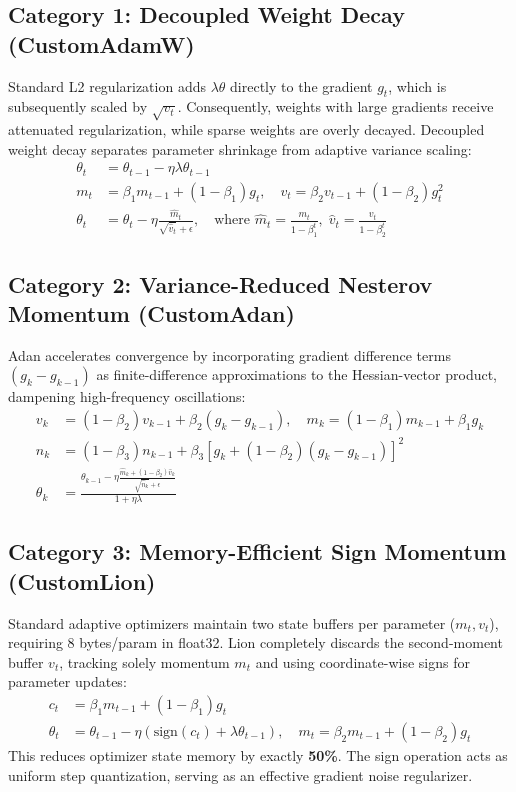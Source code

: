 \documentclass[11pt,a4paper]{article}
\begin{document}
\subsection{Category 1: Decoupled Weight Decay (CustomAdamW)}
Standard L2 regularization adds $\lambda \theta$ directly to the gradient $g_t$, which is subsequently scaled by $\sqrt{v_t}$. Consequently, weights with large gradients receive attenuated regularization, while sparse weights are overly decayed. Decoupled weight decay separates parameter shrinkage from adaptive variance scaling:
\begin{align}
\theta_t &= \theta_{t-1} - \eta \lambda \theta_{t-1} \\
m_t &= \beta_1 m_{t-1} + (1-\beta_1) g_t, \quad v_t = \beta_2 v_{t-1} + (1-\beta_2) g_t^2 \\
\theta_t &= \theta_t - \eta \frac{\hat{m}_t}{\sqrt{\hat{v}_t} + \epsilon}, \quad \text{where } \hat{m}_t = \frac{m_t}{1-\beta_1^t}, \; \hat{v}_t = \frac{v_t}{1-\beta_2^t}
\end{align}

\subsection{Category 2: Variance-Reduced Nesterov Momentum (CustomAdan)}
Adan accelerates convergence by incorporating gradient difference terms $(g_k - g_{k-1})$ as finite-difference approximations to the Hessian-vector product, dampening high-frequency oscillations:
\begin{align}
v_k &= (1-\beta_2) v_{k-1} + \beta_2 (g_k - g_{k-1}), \quad m_k = (1-\beta_1) m_{k-1} + \beta_1 g_k \\
n_k &= (1-\beta_3) n_{k-1} + \beta_3 [g_k + (1-\beta_2)(g_k - g_{k-1})]^2 \\
\theta_k &= \frac{\theta_{k-1} - \eta \frac{\hat{m}_k + (1-\beta_2)\hat{v}_k}{\sqrt{\hat{n}_k} + \epsilon}}{1 + \eta \lambda}
\end{align}

\subsection{Category 3: Memory-Efficient Sign Momentum (CustomLion)}
Standard adaptive optimizers maintain two state buffers per parameter ($m_t, v_t$), requiring $8$ bytes/param in float32. Lion completely discards the second-moment buffer $v_t$, tracking solely momentum $m_t$ and using coordinate-wise signs for parameter updates:
\begin{align}
c_t &= \beta_1 m_{t-1} + (1-\beta_1) g_t \\
\theta_t &= \theta_{t-1} - \eta (\text{sign}(c_t) + \lambda \theta_{t-1}), \quad m_t = \beta_2 m_{t-1} + (1-\beta_2) g_t
\end{align}
This reduces optimizer state memory by exactly \textbf{50\%}. The sign operation acts as uniform step quantization, serving as an effective gradient noise regularizer.
\end{document}
